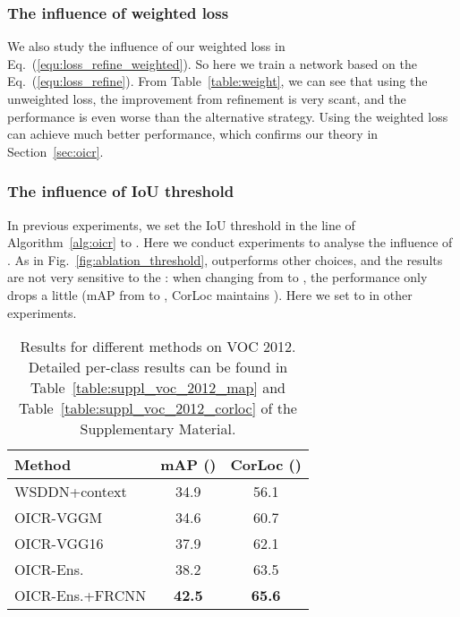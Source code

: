 \documentclass[10pt,twocolumn,letterpaper]{article}
\def\methodname{OICR}
\begin{document}
\subsubsection{The influence of weighted loss}
\label{sec:influence_wl}

We also study the influence of our weighted loss in Eq.~(\ref{equ:loss_refine_weighted}).
So here we train a network based on the Eq.~(\ref{equ:loss_refine}).
From Table~\ref{table:weight}, we can see that using the unweighted loss, the improvement from refinement is very scant, and the performance is even worse than the alternative strategy.
Using the weighted loss can achieve much better performance, which confirms our theory in Section~\ref{sec:oicr}.


\subsubsection{The influence of IoU threshold}
\label{sec:influence_it}

In previous experiments, we set the IoU threshold  in the  line of Algorithm~\ref{alg:oicr} to .
Here we conduct experiments to analyse the influence of .
As in Fig.~\ref{fig:ablation_threshold},  outperforms other choices, and the results are not very sensitive to the : when changing  from  to , the performance only drops a little (mAP from  to , CorLoc maintains ).
Here we set  to  in other experiments.



\begin{table}[t]
\begin{center}
\footnotesize
\begin{tabular}{|l|c|c|}
   \hline
   Method & mAP () & CorLoc () \\
   \hline\hline
   WSDDN+context \cite{Ref:Kantorov2016} & 34.9 & 56.1 \\
   \hline
   \methodname-VGGM & 34.6 & 60.7\\
   \methodname-VGG16 & 37.9 & 62.1\\
   \hline
   \methodname-Ens. & 38.2 & 63.5 \\
   \methodname-Ens.+FRCNN & \bf{42.5} & \bf{65.6} \\
   \hline
\end{tabular}
\end{center}
\caption{Results for different methods on VOC 2012. Detailed per-class results can be found in Table~\ref{table:suppl_voc_2012_map} and Table~\ref{table:suppl_voc_2012_corloc} of the Supplementary Material.}
\label{table:voc_2012}
\end{table}
\end{document}

